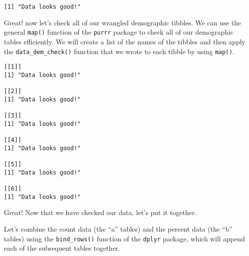 \documentclass[
]{article}
\newenvironment{Shaded}{\begin{snugshade}}{\end{snugshade}}
\newcommand{\FloatTok}[1]{\textcolor[rgb]{0.00,0.00,0.81}{#1}}
\newcommand{\KeywordTok}[1]{\textcolor[rgb]{0.13,0.29,0.53}{\textbf{#1}}}
\newcommand{\NormalTok}[1]{#1}
\newcommand{\OperatorTok}[1]{\textcolor[rgb]{0.81,0.36,0.00}{\textbf{#1}}}
\newcommand{\StringTok}[1]{\textcolor[rgb]{0.31,0.60,0.02}{#1}}
\begin{document}
\begin{Shaded}
\begin{Highlighting}[]
{{{{{\KeywordTok{ifelse}\NormalTok{(}\KeywordTok{all}\NormalTok{(results }\OperatorTok{==}\StringTok{ "Good!"}\NormalTok{),}
       \StringTok{"Data looks good!"}\NormalTok{, }\KeywordTok{glimpse}\NormalTok{(results))}
\NormalTok{\}}

\KeywordTok{data_dem_check}\NormalTok{(table11}\FloatTok{.4}\NormalTok{a)}
\end{Highlighting}
\end{Shaded}

\begin{verbatim}
[1] "Data looks good!"
\end{verbatim}

Great! now let's check all of our wrangled demographic tibbles. We can
use the general \texttt{map()} function of the \texttt{purrr} package to
check all of our demographic tables efficiently. We will create a list
of the names of the tibbles and then apply the
\texttt{data\_dem\_check()} function that we wrote to each tibble by
using \texttt{map()}.

\begin{Shaded}
\end{Shaded}

\begin{verbatim}
[[1]]
[1] "Data looks good!"

[[2]]
[1] "Data looks good!"

[[3]]
[1] "Data looks good!"

[[4]]
[1] "Data looks good!"

[[5]]
[1] "Data looks good!"

[[6]]
[1] "Data looks good!"
\end{verbatim}

Great! Now that we have checked our data, let's put it together.

Let's combine the count data (the ``a'' tables) and the percent data
(the ``b'' tables) using the \texttt{bind\_rows()} function of the
\texttt{dplyr} package, which will append each of the subsequent tables
together.
\end{document}
